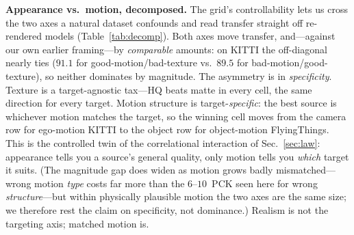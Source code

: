 \documentclass[runningheads]{llncs}
\newcommand{\pck}{PCK}
\begin{document}
\begin{table}[t]
\centering
\caption{\textbf{Motion and appearance, crossed} on the controllable grid: a
complete $2{\times}2$ (motion structure $\times$ texture) of from-scratch \pck,
bold $=$ best of the four cells, on realistic GSO assets (so HQ\,$\to$\,matte is a
genuine appearance degradation). The best cell is always good-motion\,$\times$\,HQ
---but \emph{which} motion is ``good'' is set by the target: camera motion for
ego-motion KITTI-2012 (top), object motion for object-motion FlyingThings
(bottom), so the bold cell moves to a different physical row. Texture is a fixed
tax (HQ\,$>$\,matte in every cell, bit-identical flow, md5-verified), the same
direction for both targets. The two effects are \emph{comparable in size}---on
KITTI the off-diagonal nearly ties ($91.1$ good-motion/bad-texture vs.\ $89.5$
bad-motion/good-texture)---so the distinction is not magnitude but
\emph{specificity}: only motion's advantage is target-dependent. The same
$2{\times}2$ replicates on basic KuBasic assets and, compressed, with a
pretrained backbone (supp.). Single seed; the load-bearing signal is the
cross-target flip of the best cell, not within-panel sub-seed-band gaps.}
\label{tab:decomp}
\small

\end{table}

\noindent\textbf{Appearance vs.\ motion, decomposed.}
The grid's controllability lets us cross the two axes a natural dataset
confounds and read transfer straight off re-rendered models
(Table~\ref{tab:decomp}). Both axes move transfer, and---against our own earlier
framing---by \emph{comparable} amounts: on KITTI the off-diagonal nearly ties
($91.1$ for good-motion/bad-texture vs.\ $89.5$ for bad-motion/good-texture), so
neither dominates by magnitude. The asymmetry is in \emph{specificity}.
Texture is a target-agnostic tax---HQ beats matte in every cell, the same
direction for every target. Motion structure is target-\emph{specific}: the best
source is whichever motion matches the target, so the winning cell moves from the
camera row for ego-motion KITTI to the object row for object-motion
FlyingThings. This is the controlled twin of the correlational interaction of
Sec.~\ref{sec:law}: appearance tells you a source's general quality, only motion
tells you \emph{which} target it suits. (The magnitude gap does widen as motion
grows badly mismatched---wrong motion \emph{type} costs far more than the
$6$--$10$~\pck{} seen here for wrong \emph{structure}---but within physically
plausible motion the two axes are the same size; we therefore rest the claim on
specificity, not dominance.) Realism is not the targeting axis; matched motion
is.
\end{document}
